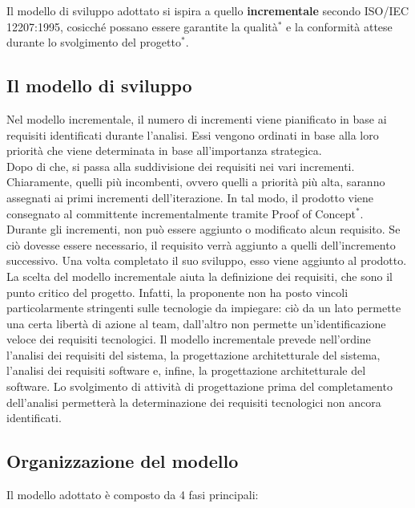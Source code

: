 Il modello di sviluppo adottato si ispira a quello \textbf{incrementale} secondo ISO/IEC 12207:1995, cosicché possano essere garantite la qualità$^*$ e la conformità attese durante lo svolgimento del progetto$^*$.

\subsection{Il modello di sviluppo}
Nel modello incrementale, il numero di incrementi viene pianificato in base ai requisiti identificati durante l'analisi. Essi vengono ordinati in base alla loro priorità che viene determinata in base all'importanza strategica.\\
Dopo di che, si passa alla suddivisione dei requisiti nei vari incrementi. Chiaramente, quelli più incombenti, ovvero quelli a priorità più alta, saranno assegnati ai primi incrementi dell'iterazione. In tal modo, il prodotto viene consegnato al committente incrementalmente tramite Proof of Concept$^*$.\\
Durante gli incrementi, non può essere aggiunto o modificato alcun requisito. Se ciò dovesse essere necessario, il requisito verrà aggiunto a quelli dell'incremento successivo. Una volta completato il suo sviluppo, esso viene aggiunto al prodotto.\\
La scelta del modello incrementale aiuta la definizione dei requisiti, che sono il punto critico del progetto. Infatti, la proponente non ha posto vincoli particolarmente stringenti sulle tecnologie da impiegare: ciò da un lato permette una certa libertà di azione al team, dall'altro non permette un'identificazione veloce dei requisiti tecnologici. Il modello incrementale prevede nell'ordine l'analisi dei requisiti del sistema, la progettazione architetturale del sistema, l'analisi dei requisiti software e, infine, la progettazione architetturale del software. Lo svolgimento di attività di progettazione prima del completamento dell'analisi permetterà la determinazione dei requisiti tecnologici non ancora identificati.

\subsection{Organizzazione del modello}
Il modello adottato è composto da 4 fasi principali:
